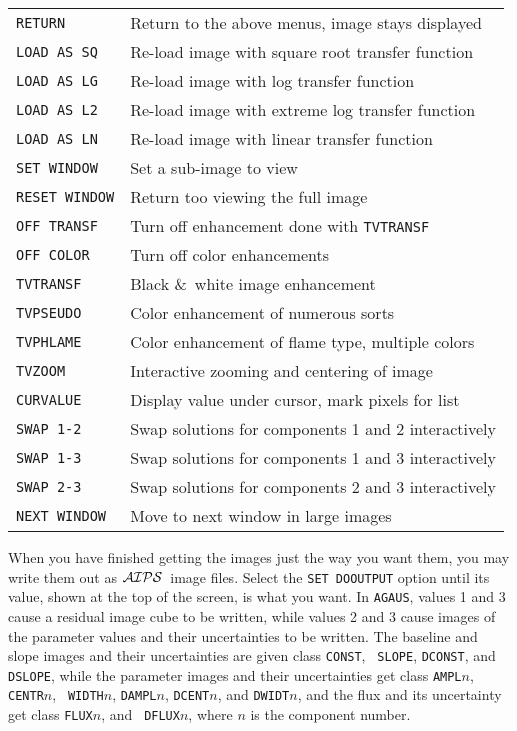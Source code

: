 \documentclass[twoside]{article}
\newcommand{\AIPS}{{$\cal AIPS\/$}}
\begin{document}
\begin{center}
\begin{tabular}{|l|l|}\hline
 {\tt RETURN     } & Return to the above menus, image stays displayed\\
 {\tt LOAD AS SQ } & Re-load image with square root transfer function\\
 {\tt LOAD AS LG } & Re-load image with log transfer function\\
 {\tt LOAD AS L2 } & Re-load image with extreme log transfer function\\
 {\tt LOAD AS LN } & Re-load image with linear transfer function\\
 {\tt SET WINDOW } & Set a sub-image to view\\
 {\tt RESET WINDOW} & Return too viewing the full image\\
 {\tt OFF TRANSF } & Turn off enhancement done with {\tt TVTRANSF}\\
 {\tt OFF COLOR  } & Turn off color enhancements\\
 {\tt TVTRANSF   } & Black \&\ white image enhancement\\
 {\tt TVPSEUDO   } & Color enhancement of numerous sorts\\
 {\tt TVPHLAME   } & Color enhancement of flame type, multiple colors\\
 {\tt TVZOOM     } & Interactive zooming and centering of image\\
 {\tt CURVALUE   } & Display value under cursor, mark pixels for list\\
 {\tt SWAP 1-2   } & Swap solutions for components 1 and 2 interactively\\
 {\tt SWAP 1-3   } & Swap solutions for components 1 and 3 interactively\\
 {\tt SWAP 2-3   } & Swap solutions for components 2 and 3 interactively\\
 {\tt NEXT WINDOW} & Move to next window in large images\\ \hline
\end{tabular}
\end{center}

When you have finished getting the images just the way you want them,
you may write them out as \AIPS\ image files.  Select the {\tt SET
  DOOUTPUT} option until its value, shown at the top of the screen, is
what you want.  In {\tt AGAUS}, values 1 and 3 cause a residual image
cube to be written, while values 2 and 3 cause images of the parameter
values and their uncertainties to be written.  The baseline and slope
images and their uncertainties are given class {\tt CONST}, {\tt
  SLOPE}, {\tt DCONST}, and {\tt DSLOPE}, while the parameter images
and their uncertainties get class {\tt AMPL$n$}, {\tt CENTR$n$}, {\tt
  WIDTH$n$}, {\tt DAMPL$n$}, {\tt DCENT$n$}, and {\tt DWIDT$n$}, and
the flux and its uncertainty get class {\tt FLUX$n$}, and {\tt
  DFLUX$n$}, where $n$ is the component number.
\end{document}
